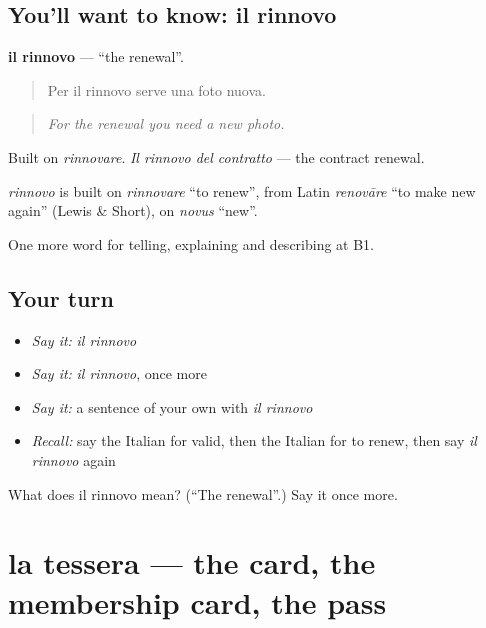 \subsection*{You'll want to know: il rinnovo}
\textbf{il rinnovo} — \textquotedblleft{}the renewal\textquotedblright{}.

\begin{quote}
Per il rinnovo serve una foto nuova.
\end{quote}

\begin{quote}
\emph{For the renewal you need a new photo.}
\end{quote}

Built on \emph{rinnovare}. \emph{Il rinnovo del contratto} — the contract renewal.

\begin{cousinweb}
\emph{rinnovo} is built on \emph{rinnovare} \textquotedblleft{}to renew\textquotedblright{}, from Latin \emph{renovāre} \textquotedblleft{}to make new again\textquotedblright{} (Lewis \& Short), on \emph{novus} \textquotedblleft{}new\textquotedblright{}.
\end{cousinweb}

\begin{grammarlens}[title={What you've built}]
One more word for telling, explaining and describing at B1.
\end{grammarlens}

\subsection*{Your turn}
\begin{itemize}
\raggedright
  \item \emph{Say it:} \emph{il rinnovo}
  \item \emph{Say it:} \emph{il rinnovo}, once more
  \item \emph{Say it:} a sentence of your own with \emph{il rinnovo}
  \item \emph{Recall:} say the Italian for valid, then the Italian for to renew, then say \emph{il rinnovo} again
\end{itemize}

\begin{tcolorbox}[breakable,colback=teal!4,colframe=teal!35!black,title={Before you move on}]
What does il rinnovo mean? (\textquotedblleft{}The renewal\textquotedblright{}.) Say it once more.
\end{tcolorbox}
\section[la tessera]{la tessera — the card, the membership card, the pass}

